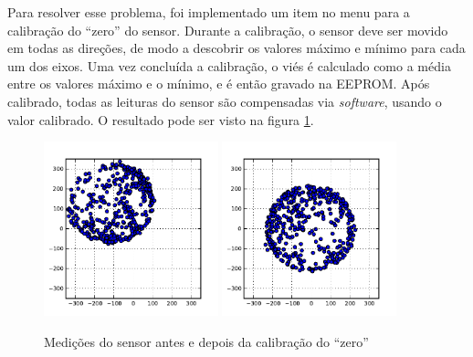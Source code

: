 \documentclass[brazil,pagestart=firstchapter]{abnt}
\begin{document}
Para resolver esse problema, foi implementado um item no menu para
a calibração do ``zero'' do sensor. Durante a calibração, o sensor deve ser
movido em todas as direções, de modo a descobrir os valores máximo e mínimo
para cada um dos eixos. Uma vez concluída a calibração, o viés é calculado
como a média entre os valores máximo e o mínimo, e é então gravado na
\ac{EEPROM}. Após calibrado, todas as leituras do sensor são compensadas via
\textit{software}, usando o valor calibrado. O resultado pode ser visto na
figura \ref{fig:zerocal}.

\begin{figure}[h]
\centering
\includegraphics[width=0.45\textwidth]{img/zerocal_off.pdf}
\includegraphics[width=0.45\textwidth]{img/zerocal_on.pdf}
\caption{Medições do sensor antes e depois da calibração do ``zero''}
\label{fig:zerocal}
\end{figure}


%
%


%
%
\end{document}
